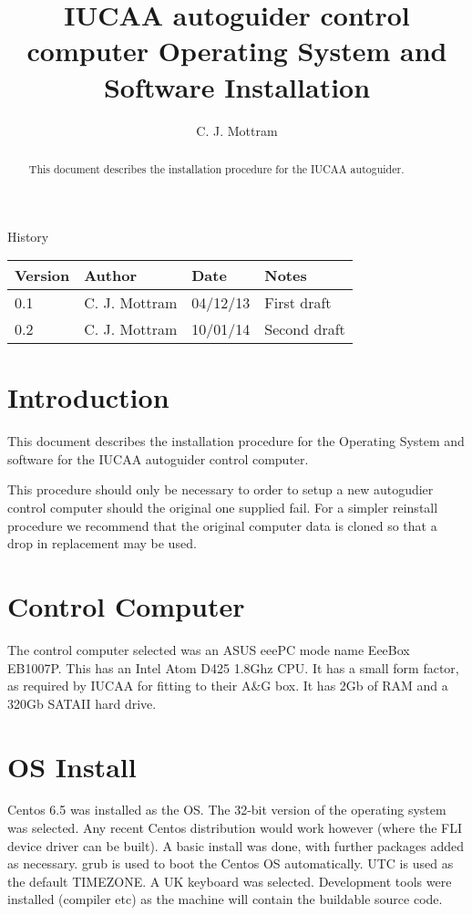 \documentclass[10pt,a4paper]{article}
\title{IUCAA autoguider control computer Operating System and Software Installation}
\author{C. J. Mottram}
\date{}
\begin{document}
\thispagestyle{empty}
\maketitle
\begin{abstract}
This document describes the installation procedure for the IUCAA autoguider.
\end{abstract}
\centerline{\Large History}
\begin{center}
\begin{tabular}{|l|l|l|p{15em}|}
\hline
{\bf Version} & {\bf Author} & {\bf Date} & {\bf Notes} \\
\hline
0.1 & C. J. Mottram & 04/12/13 & First draft \\
0.2 & C. J. Mottram & 10/01/14 & Second draft \\
\hline
\end{tabular}
\end{center}

\newpage
\tableofcontents
\listoffigures
\listoftables
\newpage

\newcommand{\mytilde}{\raise.17ex\hbox{$\scriptstyle\mathtt{\sim}$}}

\section{Introduction}
This document describes the installation procedure for the Operating System and software for the IUCAA autoguider control computer.

This procedure should only be necessary to order to setup a new autogudier control computer should the original one supplied fail. For a simpler reinstall procedure we recommend that the original computer data is cloned so that a drop in replacement may be used.

\section{Control Computer}

The control computer selected was an ASUS eeePC mode name EeeBox EB1007P. This has an Intel Atom D425 1.8Ghz CPU. It has a small form factor, as required by IUCAA for fitting to their A\&G box. It has 2Gb of RAM and a 320Gb SATAII hard drive.

\section{OS Install}
Centos 6.5 was installed as the OS. The 32-bit version of the operating system was selected. Any recent Centos distribution would work however (where the FLI device driver can be built). A basic install was done, with further packages added as necessary. grub is used to boot the Centos OS automatically. UTC is used as the default TIMEZONE. A UK keyboard was selected. Development tools were installed (compiler etc) as the machine will contain the buildable source code.
\end{document}
